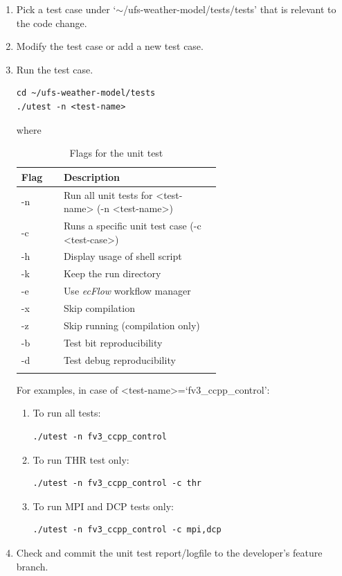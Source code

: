 \documentclass[11pt,fleqn]{report}              %
\begin{document}
\begin{enumerate}
\item Pick a test case under `$\sim$/ufs-weather-model/tests/tests' that is relevant to the code change.
\item Modify the test case or add a new test case.
\item Run the test case.

\lstset{language=bash}   
\begin{lstlisting}[frame=trBL]
cd ~/ufs-weather-model/tests
./utest -n <test-name>
\end{lstlisting}
where
{
\fontsize{10}{12}\selectfont
\begin{longtable}{ p{0.1\linewidth} | p{0.5\linewidth} }
\hline
\hline
 Flag & Description \\
\hline
 -n & Run all unit tests for <test-name> (-n <test-name>) \\
 -c & Runs a specific unit test case (-c <test-case>) \\
 -h & Display usage of shell script \\
 -k & Keep the run directory \\
 -e & Use {\it ecFlow} workflow manager \\
 -x & Skip compilation \\
 -z & Skip running (compilation only) \\
 -b & Test bit reproducibility \\
 -d & Test debug reproducibility \\
\hline
\caption{Flags for the unit test}
\label{table:flag_unit_test}
\end{longtable}
}

For examples, in case of <test-name>=`fv3\_ccpp\_control':
\begin{enumerate}
\item To run all tests:
\lstset{language=bash}   
\begin{lstlisting}[frame=trBL]
./utest -n fv3_ccpp_control
\end{lstlisting}

\item To run THR test only:
\lstset{language=bash}   
\begin{lstlisting}[frame=trBL]
./utest -n fv3_ccpp_control -c thr
\end{lstlisting}

\item To run MPI and DCP tests only:
\lstset{language=bash}   
\begin{lstlisting}[frame=trBL]
./utest -n fv3_ccpp_control -c mpi,dcp
\end{lstlisting}

\end{enumerate}


\item Check and commit the unit test report/logfile to the developer's feature branch.
\end{enumerate}
\end{document}
